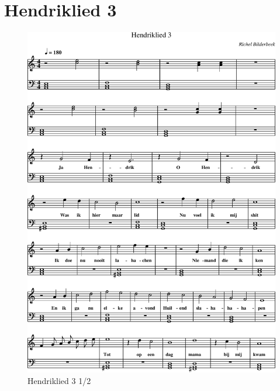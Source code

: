 \section{Hendriklied 3}



\begin{figure}[!htbp]
  \includegraphics[width=\textwidth,height=\textheight,keepaspectratio]{../songs/13_hendriklied_3-0.png}
  \caption{Hendriklied 3 1/2}
  \label{fig:13_hendriklied_3_1}
\end{figure}


